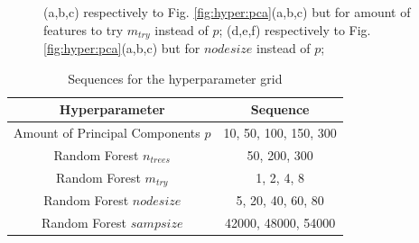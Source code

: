 \documentclass[conference]{IEEEtran}
\begin{document}
\begin{figure}[ht!]
    \quad
    \quad
    \quad

    \caption{
        \color{til}
        (a,b,c) respectively to Fig. \ref{fig:hyper:pca}(a,b,c) but for amount of features to try $m_{try}$ instead of $p$; (d,e,f) respectively to Fig. \ref{fig:hyper:pca}(a,b,c) but for ${nodesize}$ instead of $p$;
    }
    \label{fig:hyper:mtry}
\end{figure}


\begin{table}[htpb!]
    \color{til}
    \caption{\color{til}Sequences for the hyperparameter grid}
    \begin{center}
    \begin{tabular}{|c|c|}
        \hline
        \textbf{Hyperparameter} & \textbf{Sequence} \\
        \hline
        Amount of Principal Components $p$ & 10, 50, 100, 150, 300\\
        \hline
        Random Forest $n_{trees}$ & 50, 200, 300\\
        \hline
        Random Forest $m_{try}$ & 1, 2, 4, 8\\
        \hline
        Random Forest ${nodesize}$ & 5, 20, 40, 60, 80\\
        \hline
        Random Forest ${sampsize}$ & 42000, 48000, 54000\\
        \hline
    \end{tabular}
    \label{table:hyperParamGrid}
    \end{center}
\end{table}
\end{document}
